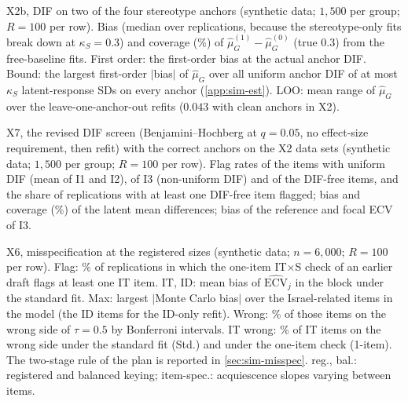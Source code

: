 \begin{table}[tbp]
\centering
\caption{X2b, DIF on two of the four stereotype anchors (synthetic data; $1{,}500$ per group; $R=100$ per row). Bias (median over replications, because the stereotype-only fits break down at $\kappa_S=0.3$) and coverage (\%) of $\hat\mu_G^{(1)}-\hat\mu_G^{(0)}$ (true $0.3$) from the free-baseline fits. First order: the first-order bias at the actual anchor DIF. Bound: the largest first-order $|$bias$|$ of $\hat\mu_G$ over all uniform anchor DIF of at most $\kappa_S$ latent-response SDs on every anchor (\cref{app:sim-est}). LOO: mean range of $\hat\mu_G$ over the leave-one-anchor-out refits ($0.043$ with clean anchors in X2).}
\label{tab:sim-anchors}
\footnotesize
\setlength{\tabcolsep}{4.2pt}

\end{table}

\begin{table}[tbp]
\centering
\caption{X7, the revised DIF screen (Benjamini--Hochberg at $q=0.05$, no effect-size requirement, then refit) with the correct anchors on the X2 data sets (synthetic data; $1{,}500$ per group; $R=100$ per row). Flag rates of the items with uniform DIF (mean of I1 and I2), of I3 (non-uniform DIF) and of the DIF-free items, and the share of replications with at least one DIF-free item flagged; bias and coverage (\%) of the latent mean differences; bias of the reference and focal ECV of I3.}
\label{tab:sim-difrev}
\footnotesize
\setlength{\tabcolsep}{4.5pt}

\end{table}

\begin{table}[tbp]
\centering
\caption{X6, misspecification at the registered sizes (synthetic data; $n=6{,}000$; $R=100$ per row). Flag: \% of replications in which the one-item IT$\times$S check of an earlier draft flags at least one IT item. IT, ID: mean bias of $\widehat{\mathrm{ECV}}_j$ in the block under the standard fit. Max: largest $|$Monte Carlo bias$|$ over the Israel-related items in the model (the ID items for the ID-only refit). Wrong: \% of those items on the wrong side of $\tau=0.5$ by Bonferroni intervals. IT wrong: \% of IT items on the wrong side under the standard fit (Std.) and under the one-item check (1-item). The two-stage rule of the plan is reported in \cref{sec:sim-misspec}. reg., bal.: registered and balanced keying; item-spec.: acquiescence slopes varying between items.}
\label{tab:sim-misspec}
\scriptsize
\setlength{\tabcolsep}{3.2pt}

\end{table}

